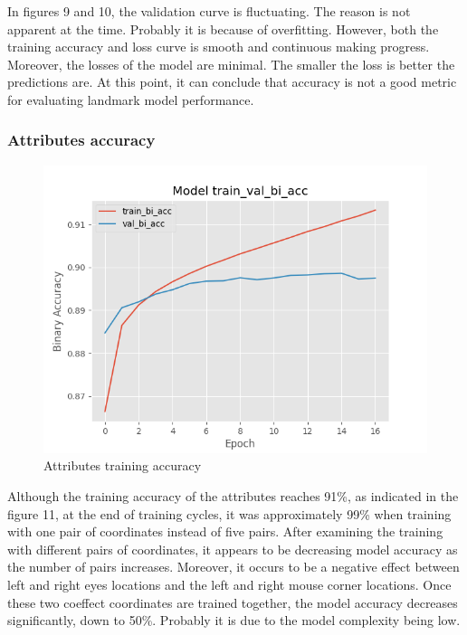 \documentclass{article}
\begin{document}
In figures 9 and 10, the validation curve is fluctuating. The reason is not apparent at the time. Probably it is because of overfitting. However, both the training accuracy and loss curve is smooth and continuous making progress. Moreover, the losses of the model are minimal. The smaller the loss is better the predictions are. At this point, it can conclude that accuracy is not a good metric for evaluating landmark model performance. 

\subsubsection{Attributes accuracy}

\begin{figure}
  \centering
  \includegraphics[scale=0.40]{Fig10}
  \caption{Attributes training accuracy}
  \label{Fig10}
\end{figure}

Although the training accuracy of the attributes reaches 91\%, as indicated in the figure 11, at the end of training cycles, it was approximately 99\% when training with one pair of coordinates instead of five pairs. After examining the training with different pairs of coordinates, it appears to be decreasing model accuracy as the number of pairs increases. Moreover, it occurs to be a negative effect between left and right eyes locations and the left and right mouse corner locations. Once these two coeffect coordinates are trained together, the model accuracy decreases significantly, down to 50\%. Probably it is due to the model complexity being low. 
\end{document}
